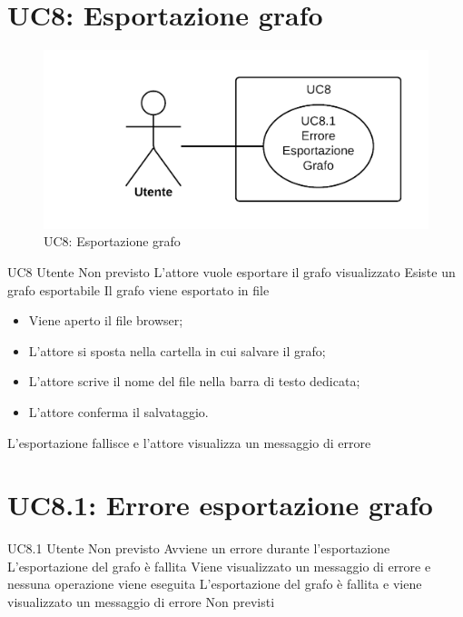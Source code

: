 \documentclass[../AnalisideiRequisiti.tex]{subfiles}
\begin{document}
\section{UC8: Esportazione grafo}
\begin{figure}[H]
	\centering
	\includegraphics[width=\textwidth]{../img/UC8.png}
	\caption{UC8: Esportazione grafo}
\end{figure}
\UserCase
{UC8}
{Utente}
{Non previsto}
{L'attore vuole esportare il grafo visualizzato}
{Esiste un grafo esportabile}
{Il grafo viene esportato in file}
{
	\begin{itemize}
			\item{} Viene aperto il file browser;
			\item{} L'attore si sposta nella cartella in cui salvare il grafo;
			\item{} L'attore scrive il nome del file nella barra di testo dedicata;
			\item{} L'attore conferma il salvataggio.
	\end{itemize}
}
{L'esportazione fallisce e l'attore visualizza un messaggio di errore }

\section{UC8.1: Errore esportazione grafo}
\UserCase
{UC8.1}
{Utente}
{Non previsto}
{Avviene un errore durante l'esportazione}
{L'esportazione del grafo è fallita}
{Viene visualizzato un messaggio di errore e nessuna operazione viene eseguita}
{L'esportazione del grafo è fallita e viene visualizzato un messaggio di errore}
{Non previsti}
\end{document}
